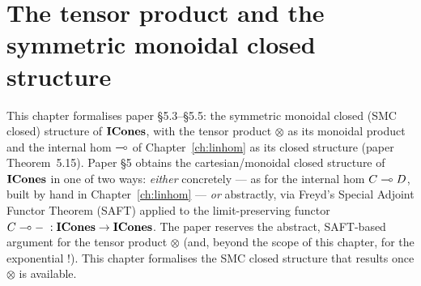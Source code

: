 %
%

\chapter{The tensor product and the symmetric monoidal closed
structure}\label{ch:tensor}

This chapter formalises paper \S5.3--\S5.5: the symmetric monoidal
closed (SMC closed) structure of $\mathbf{ICones}$, with the tensor product
$\otimes$ as its monoidal product and the internal hom $\multimap$ of
Chapter~\ref{ch:linhom} as its closed structure (paper
Theorem~5.15). Paper \S5 obtains the cartesian/monoidal closed
structure of $\mathbf{ICones}$ in one of two ways: \emph{either} concretely
--- as for the internal hom $C \multimap D$, built by hand in
Chapter~\ref{ch:linhom} --- \emph{or} abstractly, via Freyd's Special
Adjoint Functor Theorem (SAFT) applied to the limit-preserving functor
$C \multimap -\;: \mathbf{ICones} \to \mathbf{ICones}$. The paper reserves the abstract,
SAFT-based argument for the tensor product $\otimes$ (and, beyond the
scope of this chapter, for the exponential $\mathord{!}$). This
chapter formalises the SMC closed structure that results once
$\otimes$ is available.

